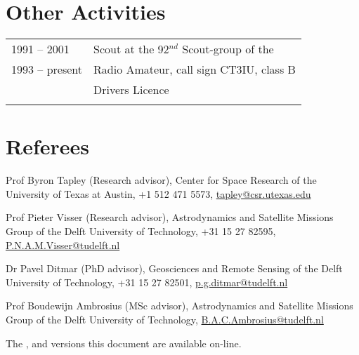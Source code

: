 \documentclass[a4paper]{article}
\newcommand{\dynhref}[2]{%
  \iftoggle{expliciturl}{%
    #2 (\href{#1}{\texttt{\detokenize{#1}}})%
  }{%
    \href{#1}{#2}%
  }%
}
\newcommand{\procv}[2]{\iftoggle{professionalcv}{#1}{#2}}
\renewenvironment{itemize}{
  \begin{list}{}{
    \setlength{\leftmargin}{1.5em}
  }
}{
  \end{list}
}
\newenvironment{cvsection}[2]{
  \setlength{\floatsep}{0pt}
  \setlength{\textfloatsep}{0pt}
  \setlength{\intextsep}{0pt}
  \section*{#1}
  \begin{longtable}{lp{#2}}
}{
  \end{longtable}
}
\newenvironment{cvtext}[1]{
  \vspace{0.15in}
  \section*{#1}
  \begin{minipage}{\textwidth}
  \setlength{\parindent}{10ex}
  \raggedright
}{
  \end{minipage}
}
\begin{document}
\begin{cvsection}{Other Activities}{12cm}
1991 -- 2001 & Scout at the 92$^{nd}$ Scout-group of the \dynhref{http://www.aep.pt}{Association of Portuguese Escoteiros}\\
1993 -- present & Radio Amateur, call sign CT3IU, class B\\
\procv{1996 -- present & Drivers Licence \\}{}
\end{cvsection}



\begin{cvtext}{Referees}
\begin{itemize}
\item Prof Byron Tapley (Research advisor), Center for Space Research of the University of Texas at Austin, +1 512 471 5573, \href{mailto:tapley@csr.utexas.edu}{tapley@csr.utexas.edu}
\item Prof Pieter Visser (Research advisor), Astrodynamics and Satellite Missions Group of the Delft University of Technology, +31 15 27 82595, \href{mailto:P.N.A.M.Visser@tudelft.nl}{P.N.A.M.Visser@tudelft.nl}
\item Dr Pavel Ditmar (PhD advisor), Geosciences and Remote Sensing of the Delft University of Technology, +31 15 27 82501, \href{mailto:p.g.ditmar@tudelft.nl}{p.g.ditmar@tudelft.nl}
\item Prof Boudewijn Ambrosius (MSc advisor), Astrodynamics and Satellite Missions Group of the Delft University of Technology, \href{mailto:B.A.C.Ambrosius@tudelft.nl}{B.A.C.Ambrosius@tudelft.nl}
\end{itemize}
\end{cvtext}

\vfill
The \dynhref{http://jgte.github.io/cv/}{html}, \dynhref{http://jgte.github.io/cv/cv_jgte.pdf}{PDF} and \dynhref{http://jgte.github.io/cv/cv_jgte_print.pdf}{print-ready} versions this document are available on-line.
\end{document}
